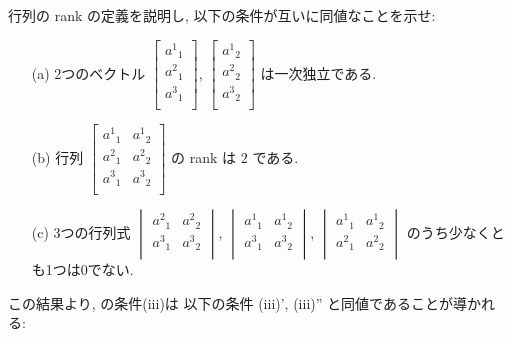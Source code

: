 \documentclass[12pt,twoside]{jarticle}
\begin{document}
\begin{question}
  行列の rank の定義を説明し, 以下の条件が互いに同値なことを示せ:
  \begin{enumerate}
  \item[(a)] 2つのベクトル %
    \(
    \begin{bmatrix}
      a^1{}_1 \\
      a^2{}_1 \\
      a^3{}_1 \\
    \end{bmatrix}
    \), %
    \(
    \begin{bmatrix}
      a^1{}_2 \\
      a^2{}_2 \\
      a^3{}_2 \\
    \end{bmatrix}
    \) %
    は一次独立である.
  \item[(b)] 行列 %
    \( \displaystyle
    \begin{bmatrix}
      a^1{}_1 & a^1{}_2 \\
      a^2{}_1 & a^2{}_2 \\
      a^3{}_1 & a^3{}_2 \\
    \end{bmatrix}
    \) の rank は $2$ である.
  \item[(c)] 3つの行列式 %
    \(
    \begin{vmatrix}
      a^2{}_1 & a^2{}_2 \\
      a^3{}_1 & a^3{}_2 \\
    \end{vmatrix}
    \), %
    \(
    \begin{vmatrix}
      a^1{}_1 & a^1{}_2 \\
      a^3{}_1 & a^3{}_2 \\
    \end{vmatrix}
    \), %
    \(
    \begin{vmatrix}
      a^1{}_1 & a^1{}_2 \\
      a^2{}_1 & a^2{}_2 \\
    \end{vmatrix}
    \) %
    のうち少なくとも1つは0でない.
  \end{enumerate}
  この結果より,  の条件(iii)は
  以下の条件 (iii)', (iii)'' と同値であることが導かれる:
\end{question}
\end{document}
